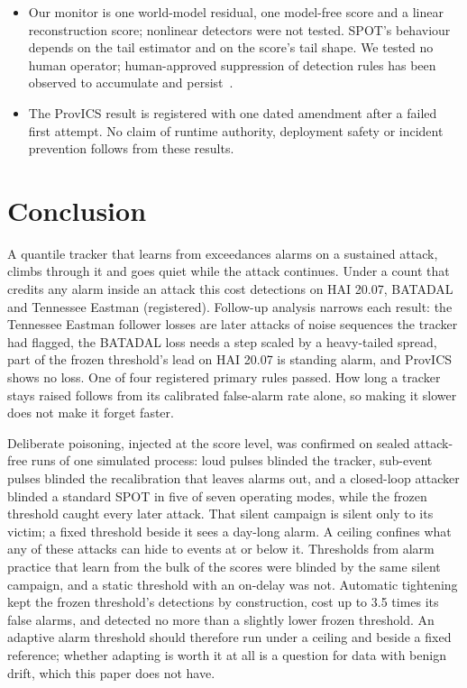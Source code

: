 \documentclass[sigconf,review,anonymous]{acmart}
\begin{document}
\begin{itemize}
  Tennessee Eastman and of the HAI development releases are unchanged (HAI 20.07, BATADAL and ProvICS
  were not rechecked), and the ProvICS validity mask (Section~\ref{sec:provics}). The other two, in
  the first smoothing window and in the hold-off tracker's episode counter, were not rechecked.
\item Our monitor is one world-model residual, one model-free score and a linear reconstruction score;
  nonlinear detectors were not tested. SPOT's behaviour depends on the tail estimator and on the
  score's tail shape. We tested no human operator; human-approved suppression of detection rules has
  been observed to accumulate and persist~\cite{dhananjeyan2026ratchet}.
\item The ProvICS result is registered with one dated amendment after a failed first attempt. No claim
  of runtime authority, deployment safety or incident prevention follows from these results.
\end{itemize}

\FloatBarrier
\section{Conclusion}

A quantile tracker that learns from exceedances alarms on a sustained attack, climbs through it and
goes quiet while the attack continues. Under a count that credits any alarm inside an attack this cost
detections on HAI 20.07, BATADAL and Tennessee Eastman (registered). Follow-up analysis narrows each
result: the Tennessee Eastman follower losses are later attacks of noise sequences the tracker had flagged, the
BATADAL loss needs a step scaled by a heavy-tailed spread, part of the frozen threshold's lead on HAI
20.07 is standing alarm, and ProvICS shows no loss. One of four registered primary rules passed. How
long a tracker stays raised follows from its calibrated false-alarm rate alone, so making it slower
does not make it forget faster.

Deliberate poisoning, injected at the score level, was confirmed on sealed attack-free runs of one
simulated process: loud pulses blinded the tracker, sub-event pulses blinded the recalibration that
leaves alarms out, and a closed-loop attacker blinded a standard SPOT in five of seven operating modes,
while the frozen threshold caught every later attack. That silent campaign is silent only to its
victim; a fixed threshold beside it sees a day-long alarm. A ceiling confines what any of these attacks
can hide to events at or below it. Thresholds from alarm practice that learn from the bulk of the
scores were blinded by the same silent campaign, and a static threshold with an on-delay was not.
Automatic tightening kept the frozen threshold's detections by
construction, cost up to 3.5 times its false alarms, and detected no more than a slightly lower frozen
threshold. An adaptive alarm threshold should therefore run under a ceiling and beside a fixed
reference; whether adapting is worth it at all is a question for data with benign drift, which this
paper does not have.
\end{document}
